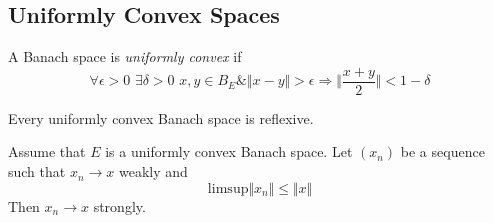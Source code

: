 \subsection{Uniformly Convex Spaces}

\begin{defn}
A Banach space is \textit{uniformly convex} if 
\[
	\forall \epsilon > 0 \hspace{4pt} \exists \delta > 0 \hspace{4pt} x,y \in B_{E} \& \Vert x-y \Vert > \epsilon \Rightarrow \Vert \frac{x+y}{2}  \Vert < 1 - \delta
\]

\end{defn}

\begin{thm}
	Every uniformly convex Banach space is reflexive.
\end{thm}

\begin{prop}
	Assume that $ E $ is a uniformly convex Banach space. Let $ (x_{n}) $ be a sequence such that $ x_{n} \to x $ weakly and
	\[
	\mathrm{limsup} \Vert x_{n} \Vert \leq \Vert x \Vert
	\]
	Then $ x_{n} \to x $ strongly.
\end{prop}

